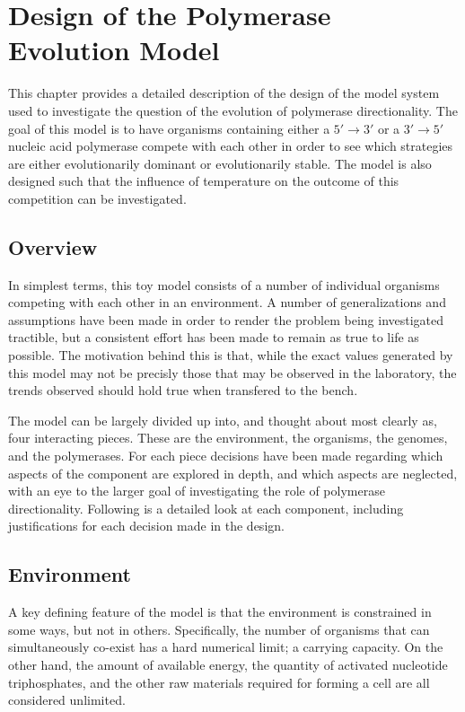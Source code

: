 \chapter{Design of the Polymerase Evolution Model} %
\label{cha:design_of_the_polymerase_evolution_model}
This chapter provides a detailed description of the design of the model system used to investigate the question of the evolution of polymerase directionality. The goal of this model is to have organisms containing either a $5'\to3'$ or a $3'\to5'$ nucleic acid polymerase compete with each other in order to see which strategies are either evolutionarily dominant or evolutionarily stable. The model is also designed such that the influence of temperature on the outcome of this competition can be investigated.

\section*{Overview} %
\label{sec:overview}
In simplest terms, this toy model consists of a number of individual organisms competing with each other in an environment. A number of generalizations and assumptions have been made in order to render the problem being investigated tractible, but a consistent effort has been made to remain as true to life as possible. The motivation behind this is that, while the exact values generated by this model may not be precisly those that may be observed in the laboratory, the trends observed should hold true when transfered to the bench.

The model can be largely divided up into, and thought about most clearly as, four interacting pieces. These are the environment, the organisms, the genomes, and the polymerases. For each piece decisions have been made regarding which aspects of the component are explored in depth, and which aspects are neglected, with an eye to the larger goal of investigating the role of polymerase directionality. Following is a detailed look at each component, including justifications for each decision made in the design.

\section*{Environment} %
\label{sec:environment}
A key defining feature of the model is that the environment is constrained in some ways, but not in others. Specifically, the number of organisms that can simultaneously co-exist has a hard numerical limit; a carrying capacity. On the other hand, the amount of available energy, the quantity of activated nucleotide triphosphates, and the other raw materials required for forming a cell are all considered unlimited.

